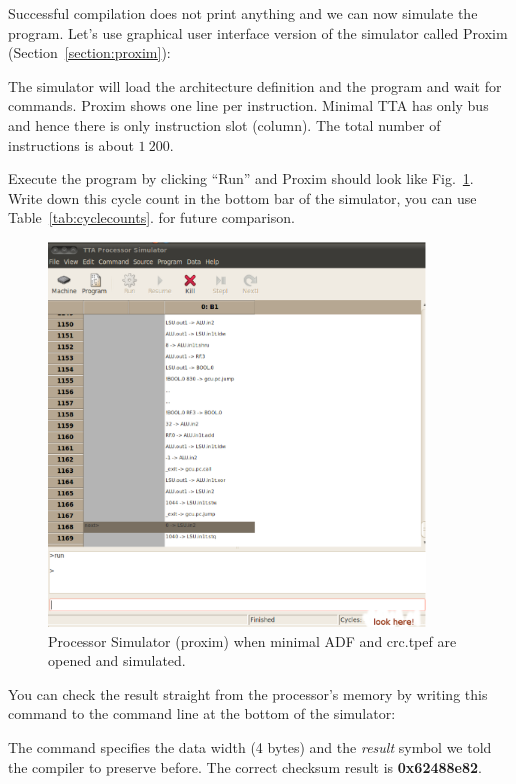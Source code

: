 \documentclass[twoside]{tceusermanual}
\begin{document}
Successful compilation does not print anything and we can now simulate
the program. Let's use graphical user interface version of the
simulator called Proxim (Section~\ref{section:proxim}):


The simulator will load the architecture definition and the program
and wait for commands. Proxim shows one line per instruction. Minimal
TTA has only bus and hence there is only instruction slot
(column). The total number of instructions is about $1~200$.

Execute the program by clicking ``Run'' and Proxim should look like
Fig.~\ref{fig:proxim}.  Write down this cycle count in the bottom bar
of the simulator, you can use Table~\ref{tab:cyclecounts}. for future comparison.
\begin{figure}
  \begin{center}
    \includegraphics[width=10cm]{eps/proxim_scrshot.eps}
    \caption{Processor Simulator (proxim) when minimal ADF 
             and crc.tpef are opened and simulated.}
    \label{fig:proxim}
  \end{center}
\end{figure}

You can check the result straight from the processor's memory by writing this
command to the command line at the bottom of the simulator:


The command specifies the data width (4 bytes) and the \textit{result} symbol we
told the compiler to preserve before. The correct checksum result is
\textbf{0x62488e82}.
\end{document}
